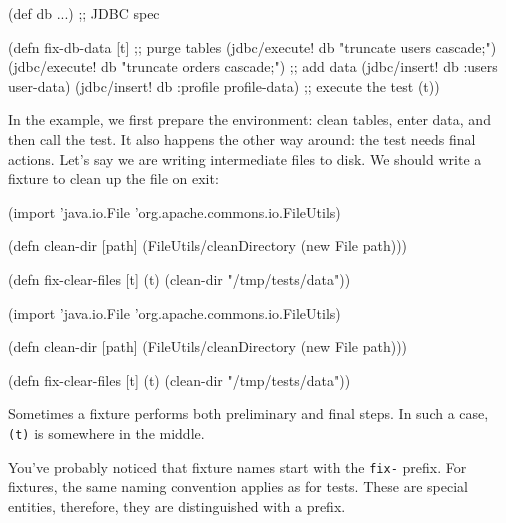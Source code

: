 \else

\begin{english}
  \begin{clojure}
(def db {...}) ;; JDBC spec

(defn fix-db-data [t]
  ;; purge tables
  (jdbc/execute! db "truncate users cascade;")
  (jdbc/execute! db "truncate orders cascade;")
  ;; add data
  (jdbc/insert! db :users user-data)
  (jdbc/insert! db :profile profile-data)
  ;; execute the test
  (t))
  \end{clojure}
\end{english}

\fi

In the example, we first prepare the environment: clean tables, enter data, and then call the test. It also happens the other way around: the test needs final actions. Let's say we are writing intermediate files to disk. We should write a fixture to clean up the file on exit:

\ifnarrow

\begin{english}
  \begin{clojure}
(import 'java.io.File
        'org.apache.commons.io.FileUtils)

(defn clean-dir [path]
  (FileUtils/cleanDirectory
    (new File path)))

(defn fix-clear-files [t]
  (t)
  (clean-dir "/tmp/tests/data"))
  \end{clojure}
\end{english}

\else

\begin{english}
  \begin{clojure}
(import 'java.io.File
        'org.apache.commons.io.FileUtils)

(defn clean-dir [path]
  (FileUtils/cleanDirectory (new File path)))

(defn fix-clear-files [t]
  (t)
  (clean-dir "/tmp/tests/data"))
  \end{clojure}
\end{english}

\fi

Sometimes a fixture performs both preliminary and final steps. In such a case, \verb|(t)| is somewhere in the middle.

You've probably noticed that fixture names start with the \verb|fix-| prefix. For fixtures, the same naming convention applies as for tests. These are special entities, therefore, they are distinguished with a prefix.

